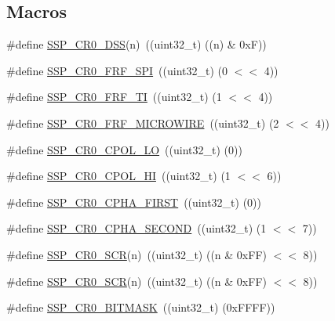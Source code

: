 \subsection*{Macros}
\begin{DoxyCompactItemize}
\item 
\#define \hyperlink{group___s_s_p__18_x_x__43_x_x_ga691ba9dbc6a0722a81ed4734c7f7ac8f}{S\+S\+P\+\_\+\+C\+R0\+\_\+\+D\+SS}(n)~((uint32\+\_\+t) ((n) \& 0x\+F))
\item 
\#define \hyperlink{group___s_s_p__18_x_x__43_x_x_ga4f0f58a8f4b87af0f18e84b981c31a74}{S\+S\+P\+\_\+\+C\+R0\+\_\+\+F\+R\+F\+\_\+\+S\+PI}~((uint32\+\_\+t) (0 $<$$<$ 4))
\item 
\#define \hyperlink{group___s_s_p__18_x_x__43_x_x_ga54c718a1a75a1e5e06417b9f8267ee27}{S\+S\+P\+\_\+\+C\+R0\+\_\+\+F\+R\+F\+\_\+\+TI}~((uint32\+\_\+t) (1 $<$$<$ 4))
\item 
\#define \hyperlink{group___s_s_p__18_x_x__43_x_x_ga7ca858fcf0f529a38e1e1bf0a69d4486}{S\+S\+P\+\_\+\+C\+R0\+\_\+\+F\+R\+F\+\_\+\+M\+I\+C\+R\+O\+W\+I\+RE}~((uint32\+\_\+t) (2 $<$$<$ 4))
\item 
\#define \hyperlink{group___s_s_p__18_x_x__43_x_x_gab4353fed07ef845a3796e154397f7e76}{S\+S\+P\+\_\+\+C\+R0\+\_\+\+C\+P\+O\+L\+\_\+\+LO}~((uint32\+\_\+t) (0))
\item 
\#define \hyperlink{group___s_s_p__18_x_x__43_x_x_ga36d7ad75edb14d318d710f964384f466}{S\+S\+P\+\_\+\+C\+R0\+\_\+\+C\+P\+O\+L\+\_\+\+HI}~((uint32\+\_\+t) (1 $<$$<$ 6))
\item 
\#define \hyperlink{group___s_s_p__18_x_x__43_x_x_gaee3465bdb33add1970f6ce7f7bc638c4}{S\+S\+P\+\_\+\+C\+R0\+\_\+\+C\+P\+H\+A\+\_\+\+F\+I\+R\+ST}~((uint32\+\_\+t) (0))
\item 
\#define \hyperlink{group___s_s_p__18_x_x__43_x_x_gae4150d0b2513ff70568be15c2170c9ea}{S\+S\+P\+\_\+\+C\+R0\+\_\+\+C\+P\+H\+A\+\_\+\+S\+E\+C\+O\+ND}~((uint32\+\_\+t) (1 $<$$<$ 7))
\item 
\#define \hyperlink{group___s_s_p__18_x_x__43_x_x_ga10f56047b6024ff848675f9463f1b989}{S\+S\+P\+\_\+\+C\+R0\+\_\+\+S\+CR}(n)~((uint32\+\_\+t) ((n \& 0x\+F\+F) $<$$<$ 8))
\item 
\#define \hyperlink{group___s_s_p__18_x_x__43_x_x_ga10f56047b6024ff848675f9463f1b989}{S\+S\+P\+\_\+\+C\+R0\+\_\+\+S\+CR}(n)~((uint32\+\_\+t) ((n \& 0x\+F\+F) $<$$<$ 8))
\item 
\#define \hyperlink{group___s_s_p__18_x_x__43_x_x_ga90be93bebdbdfee011d90ea6e054260a}{S\+S\+P\+\_\+\+C\+R0\+\_\+\+B\+I\+T\+M\+A\+SK}~((uint32\+\_\+t) (0x\+F\+F\+F\+F))
$$
\end{DoxyCompactItemize}
